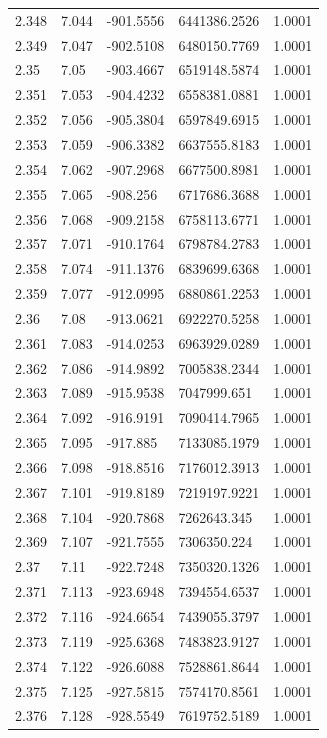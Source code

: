 \begin{tabular}{lllll}
2.348 & 7.044 & -901.5556 & 6441386.2526 & 1.0001 \\
2.349 & 7.047 & -902.5108 & 6480150.7769 & 1.0001 \\
2.35 & 7.05 & -903.4667 & 6519148.5874 & 1.0001 \\
2.351 & 7.053 & -904.4232 & 6558381.0881 & 1.0001 \\
2.352 & 7.056 & -905.3804 & 6597849.6915 & 1.0001 \\
2.353 & 7.059 & -906.3382 & 6637555.8183 & 1.0001 \\
2.354 & 7.062 & -907.2968 & 6677500.8981 & 1.0001 \\
2.355 & 7.065 & -908.256 & 6717686.3688 & 1.0001 \\
2.356 & 7.068 & -909.2158 & 6758113.6771 & 1.0001 \\
2.357 & 7.071 & -910.1764 & 6798784.2783 & 1.0001 \\
2.358 & 7.074 & -911.1376 & 6839699.6368 & 1.0001 \\
2.359 & 7.077 & -912.0995 & 6880861.2253 & 1.0001 \\
2.36 & 7.08 & -913.0621 & 6922270.5258 & 1.0001 \\
2.361 & 7.083 & -914.0253 & 6963929.0289 & 1.0001 \\
2.362 & 7.086 & -914.9892 & 7005838.2344 & 1.0001 \\
2.363 & 7.089 & -915.9538 & 7047999.651 & 1.0001 \\
2.364 & 7.092 & -916.9191 & 7090414.7965 & 1.0001 \\
2.365 & 7.095 & -917.885 & 7133085.1979 & 1.0001 \\
2.366 & 7.098 & -918.8516 & 7176012.3913 & 1.0001 \\
2.367 & 7.101 & -919.8189 & 7219197.9221 & 1.0001 \\
2.368 & 7.104 & -920.7868 & 7262643.345 & 1.0001 \\
2.369 & 7.107 & -921.7555 & 7306350.224 & 1.0001 \\
2.37 & 7.11 & -922.7248 & 7350320.1326 & 1.0001 \\
2.371 & 7.113 & -923.6948 & 7394554.6537 & 1.0001 \\
2.372 & 7.116 & -924.6654 & 7439055.3797 & 1.0001 \\
2.373 & 7.119 & -925.6368 & 7483823.9127 & 1.0001 \\
2.374 & 7.122 & -926.6088 & 7528861.8644 & 1.0001 \\
2.375 & 7.125 & -927.5815 & 7574170.8561 & 1.0001 \\
2.376 & 7.128 & -928.5549 & 7619752.5189 & 1.0001 \\

\end{tabular}
